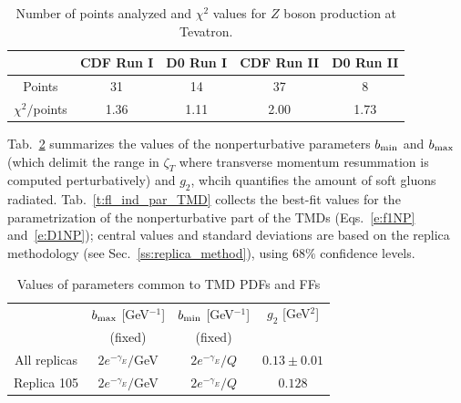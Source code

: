 \documentclass[aps,preprintnumbers,showpacs,nofootinbib,superscriptaddress,floatfix]{revtex4}
\newcommand{\bT}{\zeta_T}
\begin{document}
\begin{table}[h!]
\begin{center}
\renewcommand{\tabcolsep}{0.4pc} %
\renewcommand{\arraystretch}{1.2} %
\begin{tabular}{|c|c|c|c|c|}
 \hline
\hline
 ~                        & CDF Run I    &  D0 Run I        & CDF Run II        & D0 Run II      \\
 \hline
 Points                   &      31      &   14             &       37          &        8       \\
 \hline
$\chi^2 /$points      &  1.36        &    1.11           &       2.00         &   1.73     \\
\hline
\hline
\end{tabular}
\caption{Number of points analyzed and $\chi^2$ values for $Z$ boson production at Tevatron.}
\label{t:fl_ind_chi2_Z}
\end{center}
\end{table}


Tab.~\ref{t:fl_ind_parcommon} summarizes the values of the nonperturbative parameters $b_{\rm min}$ and $b_{\rm max}$ (which delimit the range in $\bT$ where transverse momentum resummation is computed perturbatively) and $g_2$, whcih quantifies the amount of soft gluons radiated.
Tab.~\ref{t:fl_ind_par_TMD} collects the best-fit values for the parametrization of the nonperturbative part of the TMDs (Eqs.~\eqref{e:f1NP} and~\eqref{e:D1NP}); central values and standard deviations are based on the replica methodology (see Sec.~\ref{ss:replica_method}), using $68\%$ confidence levels.


\begin{table}[h!]
\small
  \centering
  \begin{tabular}{|c|c|c|c|}
\hline
\hline
&$b_{\rm max}$ [GeV$^{-1}$] & $b_{\rm min}$ [GeV$^{-1}$] &  $g_2$ {[GeV$^2$]} 
 \\ 
& (fixed)     & (fixed)   &                            \\
\hline
All replicas & $2 e^{-\gamma_E}/$GeV& $2 e^{-\gamma_E}/Q$  & $0.13 \pm 0.01$  \\
\hline
Replica 105 &  $2 e^{-\gamma_E}/$GeV& $2 e^{-\gamma_E}/Q$  & $0.128$  \\
\hline
\hline
\end{tabular}
\caption{Values of parameters common to TMD PDFs and FFs}
\label{t:fl_ind_parcommon}
\end{table}
\end{document}

